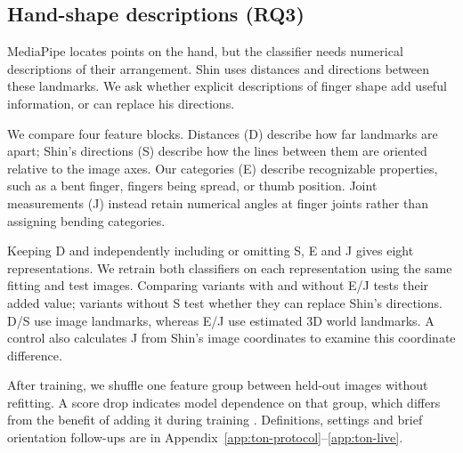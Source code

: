 \subsection{Hand-shape descriptions (RQ3)}\label{sec:ton-methods}
MediaPipe locates points on the hand, but the classifier needs numerical descriptions of their arrangement. Shin uses distances and directions between these landmarks. We ask whether explicit descriptions of finger shape add useful information, or can replace his directions.

We compare four feature blocks. Distances (D) describe how far landmarks are apart; Shin's directions (S) describe how the lines between them are oriented relative to the image axes. Our categories (E) describe recognizable properties, such as a bent finger, fingers being spread, or thumb position. Joint measurements (J) instead retain numerical angles at finger joints rather than assigning bending categories.

Keeping D and independently including or omitting S, E and J gives eight representations. We retrain both classifiers on each representation using the same fitting and test images. Comparing variants with and without E/J tests their added value; variants without S test whether they can replace Shin's directions. D/S use image landmarks, whereas E/J use estimated 3D world landmarks. A control also calculates J from Shin's image coordinates to examine this coordinate difference.

After training, we shuffle one feature group between held-out images without refitting. A score drop indicates model dependence on that group, which differs from the benefit of adding it during training \citep{ton-sklearnpermutation}. Definitions, settings and brief orientation follow-ups are in Appendix~\ref{app:ton-protocol}--\ref{app:ton-live}.
